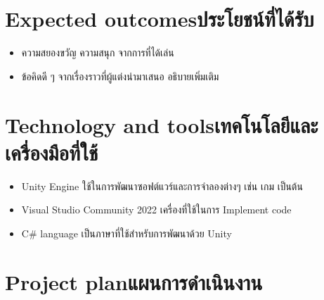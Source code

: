 

\section{\ifenglish Expected outcomes\else ประโยชน์ที่ได้รับ\fi}
\begin{itemize}
    \item ความสยองขวัญ ความสนุก จากการที่ได้เล่น
    \item ข้อคิดดี ๆ จากเรื่องราวที่ผู้แต่งนำมาเสนอ อธิบายเพิ่มเติม
\end{itemize}

\section{\ifenglish Technology and tools\else เทคโนโลยีและเครื่องมือที่ใช้\fi}


\begin{itemize}
    \item Unity Engine ใช้ในการพัฒนาซอฟต์แวร์และการจำลองต่างๆ เช่น เกม เป็นต้น
    \item Visual Studio Community 2022 เครื่องที่ใช้ในการ Implement code
    \item C$\#$ language เป็นภาษาที่ใช้สำหรับการพัฒนาด้วย Unity
\end{itemize}

\section{\ifenglish Project plan\else แผนการดำเนินงาน\fi}


